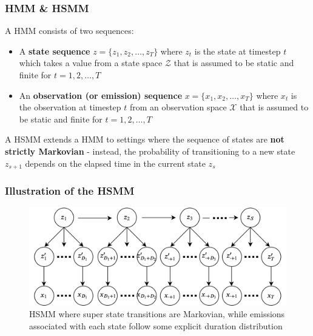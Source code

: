 \documentclass{beamer}
\begin{document}
\begin{frame}
    \frametitle{HMM \& HSMM}
        A HMM consists of two sequences:
        \begin{itemize}
          \item A \textbf{state sequence} $z = \{z_1, z_2, \dots, z_T\}$ where $z_t$ is the state at timestep $t$ which takes a value from a state space $\mathcal{Z}$ that is assumed to be static and finite for $t = 1, 2, \dots, T$
          \item An \textbf{observation (or emission) sequence} $x = \{x_1, x_2, \dots, x_T\}$ where $x_t$ is the observation at timestep $t$ from an observation space $\mathcal{X}$ that is assumed to be static and finite for $t = 1, 2, \dots, T$
        \end{itemize}

        A HSMM extends a HMM to settings where the sequence of states are \textbf{not strictly Markovian} - instead, the probability of transitioning to a new state $z_{s+1}$ depends on the elapsed time in the current state $z_s$
\end{frame}

\begin{frame}
    \frametitle{Illustration of the HSMM}
    \begin{figure}[H]
    \centering
    \includegraphics[scale=0.15]{images/hsmm2.png}
    \caption{HSMM where super state transitions are Markovian, while emissions associated with each state follow some explicit duration distribution}
    \label{fig:hsmm}
    \end{figure}
\end{frame}
\end{document}
